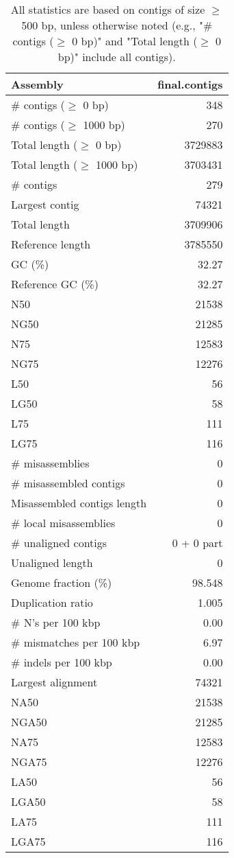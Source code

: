 \documentclass[12pt,a4paper]{article}
\begin{document}
\begin{table}[ht]
\begin{center}
\caption{All statistics are based on contigs of size $\geq$ 500 bp, unless otherwise noted (e.g., "\# contigs ($\geq$ 0 bp)" and "Total length ($\geq$ 0 bp)" include all contigs).}
\begin{tabular}{|l*{1}{|r}|}
\hline
Assembly & final.contigs \\ \hline
\# contigs ($\geq$ 0 bp) & 348 \\ \hline
\# contigs ($\geq$ 1000 bp) & 270 \\ \hline
Total length ($\geq$ 0 bp) & 3729883 \\ \hline
Total length ($\geq$ 1000 bp) & 3703431 \\ \hline
\# contigs & 279 \\ \hline
Largest contig & 74321 \\ \hline
Total length & 3709906 \\ \hline
Reference length & 3785550 \\ \hline
GC (\%) & 32.27 \\ \hline
Reference GC (\%) & 32.27 \\ \hline
N50 & 21538 \\ \hline
NG50 & 21285 \\ \hline
N75 & 12583 \\ \hline
NG75 & 12276 \\ \hline
L50 & 56 \\ \hline
LG50 & 58 \\ \hline
L75 & 111 \\ \hline
LG75 & 116 \\ \hline
\# misassemblies & 0 \\ \hline
\# misassembled contigs & 0 \\ \hline
Misassembled contigs length & 0 \\ \hline
\# local misassemblies & 0 \\ \hline
\# unaligned contigs & 0 + 0 part \\ \hline
Unaligned length & 0 \\ \hline
Genome fraction (\%) & 98.548 \\ \hline
Duplication ratio & 1.005 \\ \hline
\# N's per 100 kbp & 0.00 \\ \hline
\# mismatches per 100 kbp & 6.97 \\ \hline
\# indels per 100 kbp & 0.00 \\ \hline
Largest alignment & 74321 \\ \hline
NA50 & 21538 \\ \hline
NGA50 & 21285 \\ \hline
NA75 & 12583 \\ \hline
NGA75 & 12276 \\ \hline
LA50 & 56 \\ \hline
LGA50 & 58 \\ \hline
LA75 & 111 \\ \hline
LGA75 & 116 \\ \hline
\end{tabular}
\end{center}
\end{table}
\end{document}
